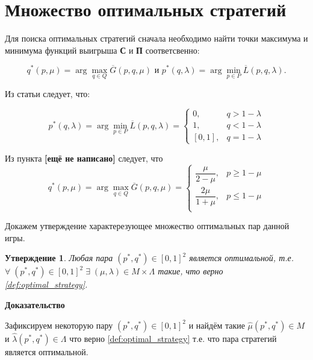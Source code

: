 \section{Множество оптимальных стратегий}

Для поиска оптимальных стратегий сначала необходимо найти точки максимума и минимума 
функций выигрыша \textbf{С} и \textbf{П} соответсвенно:

$$
	q^*(p, \mu) = \arg \max \limits_{q \in Q} \overline G(p, q, \mu)
	\textrm{ и }
	p^*(q, \lambda) = \arg \min \limits_{p \in P} \overline L(p, q, \lambda).
$$

Из статьи \cite{novikova} следует, что:

\begin{equation}
	p^*(q, \lambda)=
	\arg \min \limits_{p \in P} \overline L(p, q, \lambda) =
	\begin{cases}
		0, & q > 1 - \lambda \\
		1, & q < 1 - \lambda \\
		[0,1], & q = 1 - \lambda
	\end{cases}
	\label{eq:argmin_L_1}
\end{equation}

Из пункта \textbf{[ещё не написано]} следует, что
\begin{equation}
	q^*(p, \mu) = \arg \max \limits_{q \in Q} \overline G(p, q, \mu) =
	\begin{cases}
		\dfrac{\mu}{2 - \mu}, & p \geqslant 1 - \mu \\
		\dfrac{2\mu}{1 + \mu}, & p \leqslant 1 -\mu \\
	\end{cases}
	\label{eq:argmax_G_1}
\end{equation}

Докажем утверждение характерезующее множество оптимальных пар данной игры.

\newtheorem{State}{Утверждение}\label{State:opt_strat_1}
\begin{State}
	Любая пара $(p^*, q^*) \in [0, 1]^2$ является оптимальной, т.е.  
	$\forall \; (p^*, q^*) \in [0, 1]^2 \; \exists \; 
	(\mu, \lambda) \in M \times \Lambda$
	такие, что верно \eqref{def:optimal_strategy}.
\end{State}


\textbf{Доказательство}

Зафиксируем некоторую пару  $(p^*, q^*) \in [0, 1]^2$ и найдём такие 
$\hat \mu (p^*, q^*) \in M$ и $\hat \lambda (p^*, q^*) \in \Lambda$ 
что верно \eqref{def:optimal_strategy} т.е. что пара стратегий является оптимальной.

